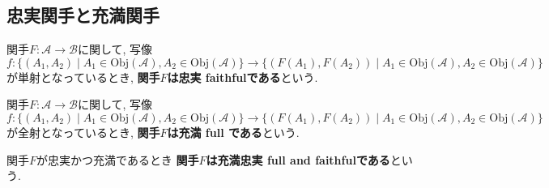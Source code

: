 \subsection{忠実関手と充満関手}
\begin{Def}
関手$F:\mathscr{A}\rightarrow\mathscr{B}$に関して,
写像
\[f:\{(A_1,A_2)\mid A_1\in\mathrm{Obj}(\mathscr{A}),A_2\in\mathrm{Obj}(\mathscr{A})\}\rightarrow\{(F(A_1),F(A_2))\mid A_1\in\mathrm{Obj}(\mathscr{A}),A_2\in\mathrm{Obj}(\mathscr{A})\}\]
が単射となっているとき,
{\bf 関手$F$は忠実 faithfulである}という.
\end{Def}
\begin{Def}
関手$F:\mathscr{A}\rightarrow\mathscr{B}$に関して,
写像
\[f:\{(A_1,A_2)\mid A_1\in\mathrm{Obj}(\mathscr{A}),A_2\in\mathrm{Obj}(\mathscr{A})\}\rightarrow\{(F(A_1),F(A_2))\mid A_1\in\mathrm{Obj}(\mathscr{A}),A_2\in\mathrm{Obj}(\mathscr{A})\}\]
が全射となっているとき,
{\bf 関手$F$は充満 full である}という.
\end{Def}

\begin{Def}
関手$F$が忠実かつ充満であるとき
{\bf 関手$F$は充満忠実 full and faithfulである}という.
\end{Def}
\begin{comment}
\begin{Def}
圏$\mathscr{A}$が圏$\mathscr{A}$の部分圏であり, 関手$F:\mathscr{A}\rightarrow\mathscr{B}$が充満であるとき,
{\bf 圏$\mathscr{A}$は圏 $\mathscr{B}$の充満部分圏である}という.
\end{Def}
\end{comment}
\begin{comment}
\begin{example}
...充満忠実である.
\end{example}
\begin{example}
...忠実だが充満でない
\end{example}
\begin{example}
充満だが忠実でない
\end{example}
\begin{example}
複素数...

...

...忠実だが充満でない. （例1.30)
\end{example}
\end{comment}
\begin{comment}
\subsection{埋め込み関手}
\subsection{忘却関手}
\end{comment}



